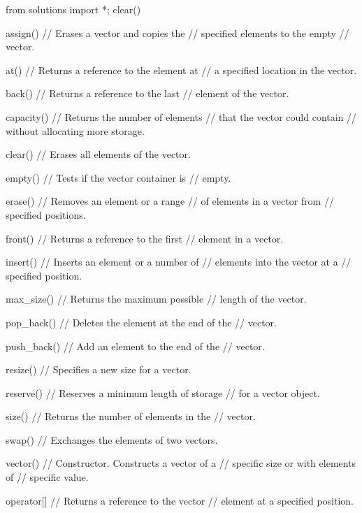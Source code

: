 \begin{python0}
from solutions import *; clear()
\end{python0}

\begin{console}
assign()        // Erases a vector and copies the
                // specified elements to the empty
                // vector.

at()            // Returns a reference to the element at
                // a specified location in the vector.

back()          // Returns a reference to the last
                // element of the vector.

capacity()      // Returns the number of elements
                // that the vector could contain
                // without allocating more storage.

clear()         // Erases all elements of the vector.

empty()         // Tests if the vector container is
                // empty.

erase()         // Removes an element or a range
                // of elements in a vector from
                // specified positions.

front()         // Returns a reference to the first
                // element in a vector.

insert()        // Inserts an element or a number of
                // elements into the vector at a
                // specified position.

max_size()      // Returns the maximum possible
                // length of the vector.

pop_back()      // Deletes the element at the end of the
                // vector.

push_back()     // Add an element to the end of the
                // vector.

resize()        // Specifies a new size for a vector.

reserve()       // Reserves a minimum length of storage
                // for a vector object.

size()          // Returns the number of elements in the
                // vector.

swap()          // Exchanges the elements of two vectors.

vector()        // Constructor. Constructs a vector of a
                // specific size or with elements of
                // specific value.

operator[]      // Returns a reference to the vector
                // element at a specified position.
\end{console}

